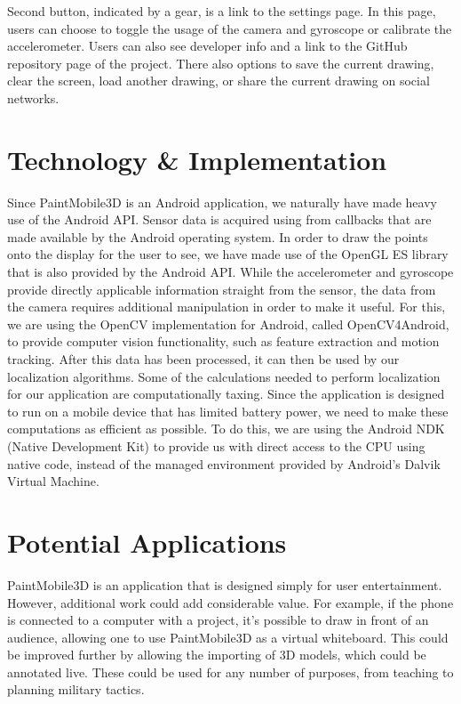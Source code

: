 \documentclass{chi-ext}
\begin{document}
Second button, indicated by a gear, is a link to the settings page. In this
page, users can choose to toggle the usage of the camera and gyroscope or
calibrate the accelerometer. Users can also see developer info and a link to
the GitHub repository page of the project. There also options to save the
current drawing, clear the screen, load another drawing, or share the current
drawing on social networks.


\section{Technology \& Implementation}

Since PaintMobile3D is an Android application, we naturally have made heavy
use of the Android API. Sensor data is acquired using from callbacks that are
made available by the Android operating system. In order to draw the points
onto the display for the user to see, we have made use of the OpenGL ES
library that is also provided by the Android API. While the accelerometer and
gyroscope provide directly applicable information straight from the sensor,
the data from the camera requires additional manipulation in order to make it
useful. For this, we are using the OpenCV implementation for Android, called
OpenCV4Android, to provide computer vision functionality, such as feature
extraction and motion tracking. After this data has been processed, it can
then be used by our localization algorithms. Some of the calculations needed
to perform localization for our application are computationally taxing. Since
the application is designed to run on a mobile device that has limited battery
power, we need to make these computations as efficient as possible. To do
this, we are using the Android NDK (Native Development Kit) to provide us with
direct access to the CPU using native code, instead of the managed environment
provided by Android's Dalvik Virtual Machine.

\section{Potential Applications}

PaintMobile3D is an application that is designed simply for user entertainment. However, additional work could add
considerable value. For example, if the phone is connected to a computer with a project, it's possible to draw in front of an audience,
allowing one to use PaintMobile3D as a virtual whiteboard. This could be improved further by allowing the importing of
3D models, which could be annotated live. These could be used for any number of purposes, from teaching to planning military tactics.
\end{document}
